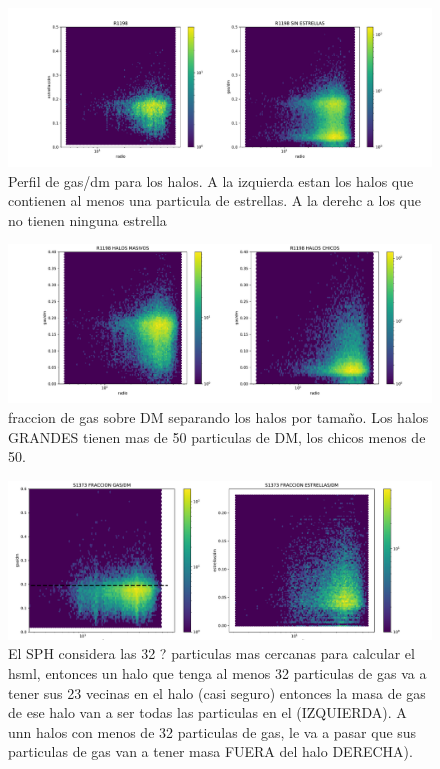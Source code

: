 \begin{figure}[h]
\centering
\includegraphics[width=1\textwidth]{Figures/R1198_scatterFRACCIONES_con&sinEST.pdf}
\decoRule
\caption[R1198 GAS/DM perfil (scatter) con y sin estrells]{Perfil de gas/dm para los halos. A  la izquierda estan los halos que contienen al menos una particula de estrellas. A la derehc a los que no tienen ninguna estrella}
\label{fig:Electron}
\end{figure}

\begin{figure}[h]
\centering
\includegraphics[width=1\textwidth]{Figures/R1198_scatterFRACCIONES_grandesYchicos.pdf}
\decoRule
\caption[R1198 GAS/DM perfil (scatter) halos grandes y chisos]{fraccion de gas sobre DM separando los halos por tamaño. Los halos GRANDES tienen mas de 50 particulas de DM, los chicos menos de 50. }
\label{fig:Electron}
\end{figure}


\begin{figure}[h]
\centering
\includegraphics[width=18cm]{Figures/S1373_scatterFRACCIONES2.pdf}
\decoRule
\caption[S1373 GAS/DM perfil (scatter)]{El SPH considera las 32 ? particulas mas cercanas para calcular el hsml, entonces un halo que tenga al menos 32 particulas de gas va a tener sus 23 vecinas en el halo (casi seguro) entonces la masa de gas de ese halo van a ser todas las particulas en el (IZQUIERDA). A unn halos con menos de 32 particulas de gas, le va a pasar que sus particulas de gas van a tener masa FUERA del halo DERECHA).}
\label{fig:Electron}
\end{figure}








